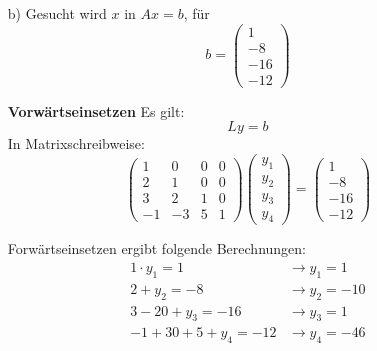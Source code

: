 \documentclass[11pt]{article}
\theoremstyle{plain}
\theoremstyle{definition}
\renewcommand{\a}{\"{a}}
\renewcommand{\u}{\"{u}}
\begin{document}
\begin{itemize}
\item[b)]
Gesucht wird $x$ in $Ax=b$, f\u r
\begin{equation}
b = 
\begin{pmatrix}
1 \\ -8 \\ -16 \\ -12
\end{pmatrix}
\end{equation}


\textbf{Vorw\a rtseinsetzen}
Es gilt:
\begin{equation}
Ly=b
\end{equation}
In Matrixschreibweise:
\begin{equation}
\begin{pmatrix}
1 & 0 & 0 & 0 \\
2 & 1 & 0 & 0 \\
3 & 2 & 1 & 0 \\
-1& -3& 5 & 1
\end{pmatrix}
\begin{pmatrix}
y_1 \\ y_2 \\ y_3 \\ y_4
\end{pmatrix}
=
\begin{pmatrix}
1 \\ -8 \\ -16 \\ -12
\end{pmatrix}
\end{equation}

Forw\a rtseinsetzen ergibt folgende Berechnungen:
\begin{align}
1 \cdot y_1 = 1   &\rightarrow y_1 = 1 \\
2 + y_2 = -8      &\rightarrow y_2=-10 \\
3-20+y_3 =-16     &\rightarrow y_3 = 1 \\
-1+30+5+y_4 = -12 &\rightarrow y_4 = -46 \\
\end{align}
 

\end{itemize}
\end{document}
